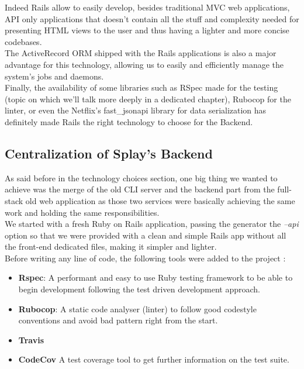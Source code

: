 \documentclass{eplmastersthesis}
\begin{document}
        Indeed Rails allow to easily develop, besides traditional MVC web
        applications, API only applications that doesn't contain all the stuff
        and complexity needed for presenting HTML views to the user and thus
        having a lighter and more concise codebases.\\
        The ActiveRecord \cite{activerecord} ORM shipped with the Rails
        applications is also a major advantage for this technology, allowing us
        to easily and efficiently manage the system's jobs and daemons.\\
        Finally, the availability of some libraries such as RSpec made for the
        testing (topic on which we'll talk more deeply in a dedicated chapter),
        Rubocop for the linter, or even the Netflix's fast\_jsonapi library for
        data serialization has definitely made Rails the right technology to
        choose for the Backend.

      \subsection{Centralization of Splay's Backend}

        As said before in the technology choices section, one big thing
        we wanted to achieve was the merge of the old CLI server and
        the backend part from the full-stack old web application as those two
        services were basically achieving the same work and holding the
        same responsibilities.\\

        We started with a fresh Ruby on Rails application, passing the
        generator the \textit{--api} option so that we were provided with
        a clean and simple Rails app without all the front-end dedicated
        files, making it simpler and lighter.\\

        Before writing any line of code, the following tools were added
        to the project :

        \begin{itemize}
          \item \textbf{Rspec}: A performant and easy to use Ruby testing
          framework to be able to begin development following the test
          driven development approach.
          \item \textbf{Rubocop}: A static code analyser (linter) to follow
          good codestyle conventions and avoid bad pattern right from the start.
          \item \textbf{Travis}
          \item \textbf{CodeCov} A test coverage tool to get further
          information on the test suite.
        \end{itemize}
\end{document}

